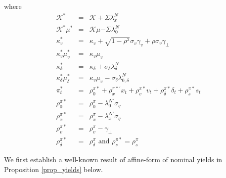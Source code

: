 \documentclass{article}
\begin{document}
where 
\begin{eqnarray*}
\mathcal{K}^{\ast } &=&\mathcal{K+}\Sigma \lambda _{x}^{N} \\
\mathcal{K}^{\ast }\mu ^{\ast } &=&\mathcal{K}\mu \mathcal{-}\Sigma \lambda
_{0}^{N} \\
\kappa _{v}^{\ast } &=&\kappa _{v}+\sqrt{1-\rho ^{2}}\sigma _{v}\gamma
_{v}+\rho \sigma _{v}\gamma _{\bot } \\
\kappa _{v}^{\ast }\mu _{v}^{\ast } &=&\kappa _{v}\mu _{v} \\
\kappa _{\delta }^{\ast } &=&\kappa _{\delta }+\sigma _{\delta }\lambda
_{\delta }^{N} \\
\kappa _{\delta }^{\ast }\mu _{\delta }^{\ast } &=&\kappa _{v}\mu
_{v}-\sigma _{\delta }\lambda _{0,\delta }^{N} \\
\pi _{t}^{\ast } &=&\rho _{0}^{\pi \ast }+\rho _{x}^{\pi \ast \prime
}x_{t}+\rho _{v}^{\pi \ast }v_{t}+\rho _{\delta }^{\pi \ast }\delta
_{t}+\rho _{s}^{\pi \ast }s_{t} \\
\rho _{0}^{\pi \ast } &=&\rho _{0}^{\pi }-\lambda _{0}^{N\prime }\sigma _{q}
\\
\rho _{x}^{\pi \ast } &=&\rho _{x}^{\pi }-\lambda _{x}^{N\prime }\sigma _{q}
\\
\rho _{v}^{\pi \ast } &=&\rho _{v}^{\pi }-\gamma _{\bot } \\
\rho _{\delta }^{\pi \ast } &=&\rho _{\delta }^{\pi }\text{ and }\rho
_{s}^{\pi \ast }=\rho _{s}^{\pi }
\end{eqnarray*}

We first establish a well-known result of affine-form of nominal yields in
Proposition \ref{prop_yields} below.
\end{document}
